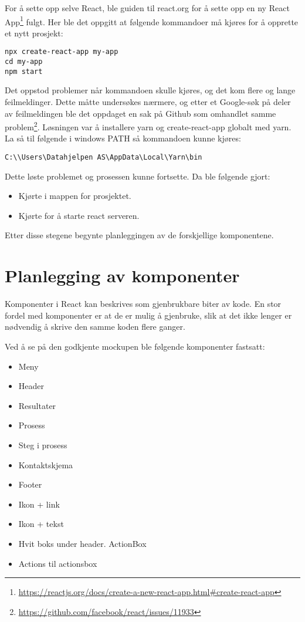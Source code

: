 For å sette opp selve React, ble  guiden til react.org for å sette opp en ny React App\footnote{\url{https://reactjs.org/docs/create-a-new-react-app.html\#create-react-app}} fulgt. Her ble det oppgitt at følgende kommandoer må kjøres for å opprette et nytt prosjekt:
\begin{lstlisting}
npx create-react-app my-app
cd my-app
npm start
\end{lstlisting}

Det oppstod problemer når kommandoen  skulle kjøres, og det kom flere og lange feilmeldinger. Dette måtte undersøkes nærmere, og etter et Google-søk på deler av feilmeldingen ble det oppdaget en sak på Github som omhandlet samme problem\footnote{\url{https://github.com/facebook/react/issues/11933}}.
Løsningen var å installere yarn og create-react-app globalt med yarn. La så til følgende i windows PATH så kommandoen kunne kjøres:
\begin{lstlisting}
C:\\Users\Datahjelpen AS\AppData\Local\Yarn\bin
\end{lstlisting}
Dette løste problemet og prosessen kunne fortsette. Da ble følgende gjort:

\begin{itemize}
\item Kjørte  i mappen for prosjektet.
\item Kjørte  for å starte react serveren.
\end{itemize}

Etter disse stegene begynte planleggingen av de forskjellige komponentene.

\section{Planlegging av komponenter}
Komponenter i React kan beskrives som gjenbrukbare biter av kode. En stor fordel med komponenter er at de er mulig å gjenbruke, slik at det ikke lenger er nødvendig å skrive den samme koden flere ganger. 

Ved å se på den godkjente mockupen ble følgende komponenter fastsatt: 
\begin{itemize}
\item Meny
\item Header
\item Resultater
\item Prosess
\item Steg i prosess
\item Kontaktskjema
\item Footer
\item Ikon + link
\item Ikon + tekst
\item Hvit boks under header. ActionBox
\item Actions til actionsbox
\end{itemize}

